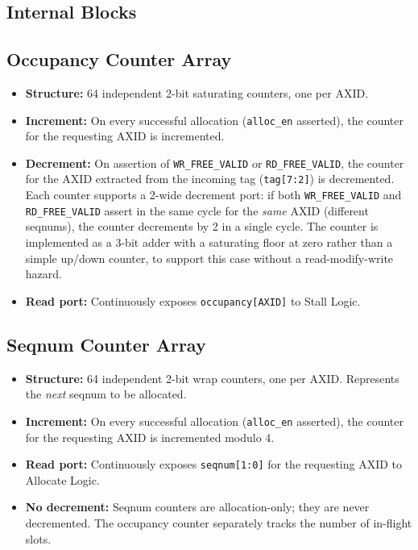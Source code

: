 \subsection{Internal Blocks}

\subsection{Occupancy Counter Array}

\begin{itemize}
  \item \textbf{Structure:} 64 independent 2-bit saturating counters,
        one per AXID.
  \item \textbf{Increment:} On every successful allocation
        (\texttt{alloc\_en} asserted), the counter for the requesting
        AXID is incremented.
  \item \textbf{Decrement:} On assertion of \texttt{WR\_FREE\_VALID} or
        \texttt{RD\_FREE\_VALID}, the counter for the AXID extracted from
        the incoming tag (\texttt{tag[7:2]}) is decremented. Each counter
        supports a 2-wide decrement port: if both \texttt{WR\_FREE\_VALID}
        and \texttt{RD\_FREE\_VALID} assert in the same cycle for the
        \emph{same} AXID (different seqnums), the counter decrements by 2
        in a single cycle. The counter is implemented as a 3-bit adder
        with a saturating floor at zero rather than a simple up/down
        counter, to support this case without a read-modify-write hazard.
  \item \textbf{Read port:} Continuously exposes
        \texttt{occupancy[AXID]} to Stall Logic.
\end{itemize}

\subsection{Seqnum Counter Array}

\begin{itemize}
  \item \textbf{Structure:} 64 independent 2-bit wrap counters, one per
        AXID. Represents the \emph{next} seqnum to be allocated.
  \item \textbf{Increment:} On every successful allocation
        (\texttt{alloc\_en} asserted), the counter for the requesting
        AXID is incremented modulo 4.
  \item \textbf{Read port:} Continuously exposes \texttt{seqnum[1:0]}
        for the requesting AXID to Allocate Logic.
  \item \textbf{No decrement:} Seqnum counters are allocation-only;
        they are never decremented. The occupancy counter separately
        tracks the number of in-flight slots.
\end{itemize}

